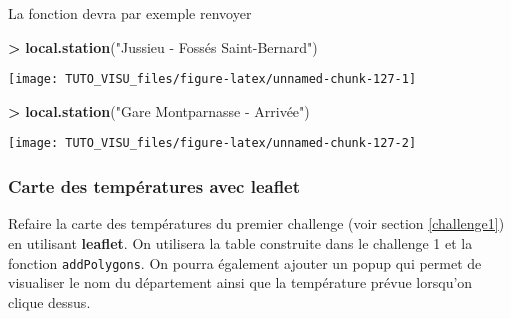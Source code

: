 \documentclass[]{article}
\newenvironment{Shaded}{\begin{snugshade}}{\end{snugshade}}
\newcommand{\KeywordTok}[1]{\textcolor[rgb]{0.13,0.29,0.53}{\textbf{#1}}}
\newcommand{\NormalTok}[1]{#1}
\newcommand{\OperatorTok}[1]{\textcolor[rgb]{0.81,0.36,0.00}{\textbf{#1}}}
\newcommand{\StringTok}[1]{\textcolor[rgb]{0.31,0.60,0.02}{#1}}
\theoremstyle{definition}
\theoremstyle{definition}
\theoremstyle{definition}
\theoremstyle{remark}
\let\BeginKnitrBlock\begin \let\EndKnitrBlock\end
\begin{document}
La fonction devra par exemple renvoyer

\begin{Shaded}
\begin{Highlighting}[]
\OperatorTok{>}\StringTok{ }\KeywordTok{local.station}\NormalTok{(}\StringTok{"Jussieu - Fossés Saint-Bernard"}\NormalTok{)}
\end{Highlighting}
\end{Shaded}

\begin{center}\texttt{[image: TUTO\_VISU\_files/figure-latex/unnamed-chunk-127-1]} \end{center}

\begin{Shaded}
\begin{Highlighting}[]
\OperatorTok{>}\StringTok{ }\KeywordTok{local.station}\NormalTok{(}\StringTok{"Gare Montparnasse - Arrivée"}\NormalTok{)}
\end{Highlighting}
\end{Shaded}

\begin{center}\texttt{[image: TUTO\_VISU\_files/figure-latex/unnamed-chunk-127-2]} \end{center}

\hypertarget{carte-des-tempuxe9ratures-avec-leaflet}{%
\subsubsection{Carte des températures avec leaflet}\label{carte-des-tempuxe9ratures-avec-leaflet}}

\BeginKnitrBlock{exercise}[Challenge]
\protect\hypertarget{exr:ggplot-challenge}{}{\label{exr:ggplot-challenge} \iffalse (Challenge) \fi{} }

Refaire la carte des températures du premier challenge (voir section \ref{challenge1}) en utilisant \textbf{leaflet}. On utilisera la table construite dans le challenge 1 et la fonction \texttt{addPolygons}. On pourra également ajouter un popup qui permet de visualiser le nom du département ainsi que la température prévue lorsqu'on clique dessus.
\EndKnitrBlock{exercise}
\end{document}

